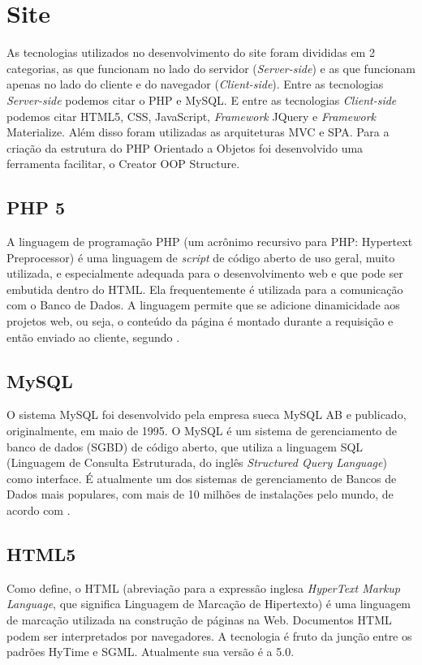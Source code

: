 \section{Site}\label{Sub:tecnologias-site}
As tecnologias utilizados no desenvolvimento do site foram divididas em 2 categorias, as que funcionam no lado do servidor (\textit{Server-side}) e as que funcionam apenas no lado do cliente e do navegador (\textit{Client-side}). Entre as tecnologias \textit{Server-side} podemos citar o PHP e MySQL. E entre as tecnologias \textit{Client-side} podemos citar HTML5, CSS, JavaScript, \textit{Framework }JQuery e \textit{Framework} Materialize. Além disso foram utilizadas as arquiteturas MVC e SPA. Para a criação da estrutura do PHP Orientado a Objetos foi desenvolvido uma ferramenta facilitar, o Creator OOP Structure.

\subsection{PHP 5}
A linguagem de programação PHP (um acrônimo recursivo para PHP: Hypertext Preprocessor) é uma linguagem de \textit{script} de código aberto de uso geral, muito utilizada, e especialmente adequada para o desenvolvimento web e que pode ser embutida dentro do HTML. Ela frequentemente é utilizada para a comunicação com o Banco de Dados. A linguagem permite que se adicione dinamicidade aos projetos web, ou seja, o conteúdo da página é montado durante a requisição e então enviado ao cliente, segundo .

\subsection{MySQL}
O sistema MySQL foi desenvolvido pela empresa sueca MySQL AB e publicado, originalmente, em maio de 1995. O MySQL é um sistema de gerenciamento de banco de dados (SGBD) de código aberto, que utiliza a linguagem SQL (Linguagem de Consulta Estruturada, do inglês \textit{Structured Query Language}) como interface. É atualmente um dos sistemas de gerenciamento de Bancos de Dados mais populares, com mais de 10 milhões de instalações pelo mundo, de acordo com \cite{miletto2014desenvolvimento}.

\subsection{HTML5}
Como  define, o HTML (abreviação para a expressão inglesa \textit{HyperText Markup Language}, que significa Linguagem de Marcação de Hipertexto) é uma linguagem de marcação utilizada na construção de páginas na Web. Documentos HTML podem ser interpretados por navegadores. A tecnologia é fruto da junção entre os padrões HyTime e SGML. Atualmente sua versão é a 5.0.

